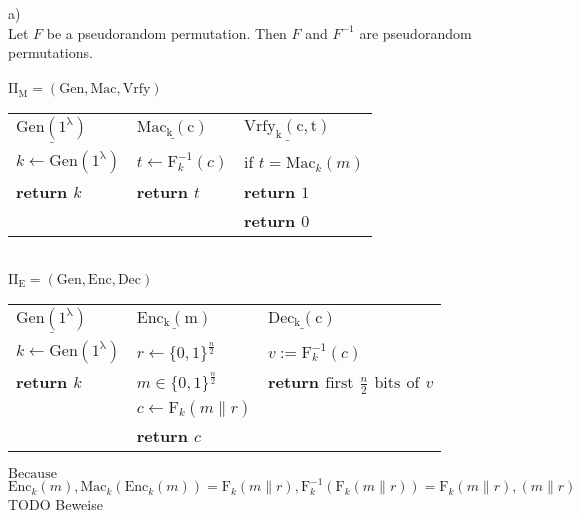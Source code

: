 \pagebreak
a)\\
Let $F$ be a pseudorandom permutation. Then $F$ and $F^{-1}$ are pseudorandom permutations.\\
\\
$\mathrm{\Pi_{M} = (Gen, Mac, Vrfy)}$\\
\vskip 0.05in
\begin{tabular}{l@{\hskip 1in}l@{\hskip 0.5in}l}
$\underline{\mathrm{Gen(1^{\lambda })}}$ & $\underline{\mathrm{Mac_{k}(c)}}$ & $\underline{\mathrm{Vrfy_{k}(c,t)}}$ \\
$k \leftarrow \mathrm{Gen(1^{\lambda})}$ & $t \leftarrow \mathrm{F}_{k}^{-1}(c)$ & if $t = \mathrm{Mac}_{k}(m)$\\
\bf{return} $k$ & \bf{return} $t$ & \indent\bf{return} $1$\\
 & & \bf{return} $0$\\
\end{tabular}\\
\vskip 1cm
\noindent$\mathrm{\Pi_{E} = (Gen, Enc, Dec)}$\\
\vskip 0.05in
\begin{tabular}{l@{\hskip 1in}l@{\hskip 0.5in}l}
$\underline{\mathrm{Gen(1^{\lambda })}}$ & $\underline{\mathrm{Enc_{k}(m)}}$ & $\underline{\mathrm{Dec_{k}(c)}}$ \\
$k \leftarrow \mathrm{Gen(1^{\lambda})}$ & $r \leftarrow \{0,1\}^{\frac{n}{2}}$ & $v := \mathrm{F}_{k}^{-1}(c)$\\
\bf{return} $k$ & $m \in  \{0,1\}^{\frac{n}{2}}$ & \bf{return} $\mathrm{first}$ $\frac{n}{2}$ $\mathrm{bits}$ $\mathrm{of}$  $v$  \\
 & $c \leftarrow \mathrm{F}_{k}(m \parallel r)$ &  \\
 & \bf{return} $c$ & \\
\end{tabular}
\vskip 1cm
\noindent $\mathrm{Because}$ $\mathrm{Enc}_{k}(m), \mathrm{Mac}_{k}(\mathrm{Enc}_{k}(m)) = \mathrm{F}_{k}(m\parallel r), \mathrm{F}_{k}^{-1}(\mathrm{F}_{k}(m\parallel r)) = \mathrm{F}_{k}(m\parallel r), (m\parallel r)$\\
\vskip 1cm
\noindent TODO Beweise 
